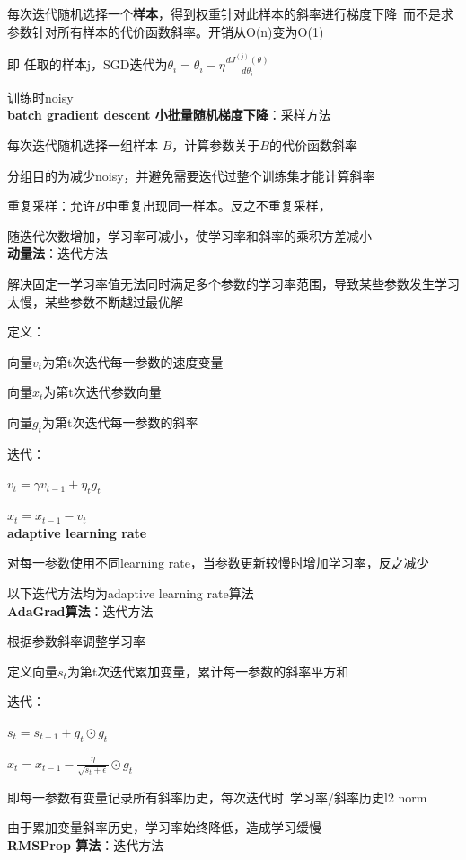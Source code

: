 \documentclass[UTF8]{ctexart}
\begin{document}
  每次迭代随机选择一个\textbf{样本}，得到权重针对此样本的斜率进行梯度下降\ 而不是求参数针对所有样本的代价函数斜率。开销从O(n)变为O(1)

  \quad 即 任取的样本j，SGD迭代为$\theta_i = \theta_i - \eta \frac{d J^{(j)}(\theta)}{d \theta_i}$
  
  \quad 训练时noisy\\
\textbf{batch gradient descent 小批量随机梯度下降}：采样方法

  每次迭代随机选择一组样本 $B$，计算参数关于$B$的代价函数斜率

  \quad 分组目的为减少noisy，并避免需要迭代过整个训练集才能计算斜率

  重复采样：允许$B$中重复出现同一样本。反之不重复采样，

  随迭代次数增加，学习率可减小，使学习率和斜率的乘积方差减小\\
\textbf{动量法}：迭代方法

  解决固定一学习率值无法同时满足多个参数的学习率范围，导致某些参数发生学习太慢，某些参数不断越过最优解

  定义：
  
  \quad 向量$v_t$为第t次迭代每一参数的速度变量

  \quad 向量$x_t$为第t次迭代参数向量

  \quad 向量$g_t$为第t次迭代每一参数的斜率

  迭代：

  \quad $v_t = \gamma v_{t-1} + \eta_t g_t$

  \quad $x_t = x_{t-1} - v_t$\\
\textbf{adaptive learning rate}

  对每一参数使用不同learning rate，当参数更新较慢时增加学习率，反之减少
  
  以下迭代方法均为adaptive learning rate算法\\
\textbf{AdaGrad算法}：迭代方法

  根据参数斜率调整学习率

  定义向量$s_t$为第t次迭代累加变量，累计每一参数的斜率平方和

  迭代：

  \quad $s_t = s_{t-1} + g_t \odot g_t$

  \quad $x_t = x_{t-1} - \frac{\eta}{\sqrt{s_t + \epsilon } } \odot g_t$

  \quad \quad 即每一参数有变量记录所有斜率历史，每次迭代时\ 学习率/斜率历史l2 norm

  由于累加变量斜率历史，学习率始终降低，造成学习缓慢\\
\textbf{RMSProp 算法}：迭代方法
\end{document}
